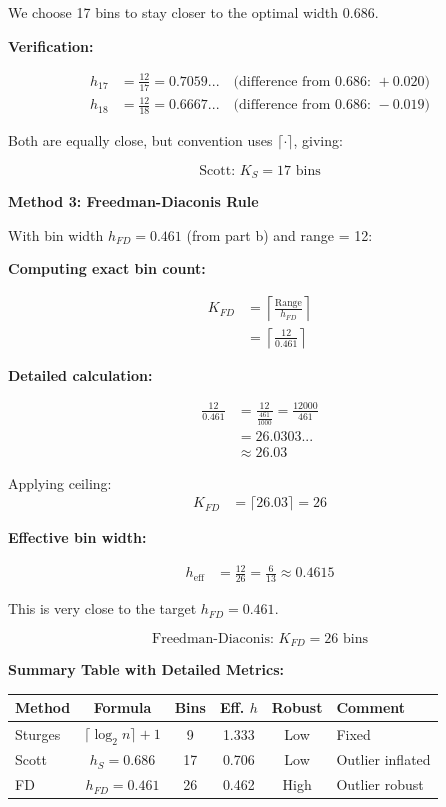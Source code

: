 \documentclass[12pt]{article}
\begin{document}
\begin{solution}
We choose 17 bins to stay closer to the optimal width 0.686.

\textbf{Verification:}

\begin{align*}
h_{17} &= \frac{12}{17} = 0.7059... \quad \text{(difference from 0.686: } +0.020\text{)} \\
h_{18} &= \frac{12}{18} = 0.6667... \quad \text{(difference from 0.686: } -0.019\text{)}
\end{align*}

Both are equally close, but convention uses \(\lceil \cdot \rceil\), giving:

\[
\boxed{\text{Scott: } K_S = 17 \text{ bins}}
\]

\textbf{Method 3: Freedman-Diaconis Rule}

With bin width \(h_{FD} = 0.461\) (from part b) and range = 12:

\textbf{Computing exact bin count:}

\begin{align*}
K_{FD} &= \left\lceil \frac{\text{Range}}{h_{FD}} \right\rceil \\
&= \left\lceil \frac{12}{0.461} \right\rceil
\end{align*}

\textbf{Detailed calculation:}

\begin{align*}
\frac{12}{0.461} &= \frac{12}{\frac{461}{1000}} = \frac{12000}{461} \\
&= 26.0303... \\
&\approx 26.03
\end{align*}

Applying ceiling:
\begin{align*}
K_{FD} &= \lceil 26.03 \rceil = 26
\end{align*}

\textbf{Effective bin width:}

\begin{align*}
h_{\text{eff}} &= \frac{12}{26} = \frac{6}{13} \approx 0.4615
\end{align*}

This is very close to the target \(h_{FD} = 0.461\).

\[
\boxed{\text{Freedman-Diaconis: } K_{FD} = 26 \text{ bins}}
\]

\textbf{Summary Table with Detailed Metrics:}

\begin{center}
\begin{tabular}{|l|c|c|c|c|p{2cm}|}
\hline
\textbf{Method} & \textbf{Formula} & \textbf{Bins} & \textbf{Eff. } $h$ & \textbf{Robust} & \textbf{Comment} \\
\hline
Sturges & \(\lceil\log_2 n\rceil + 1\) & 9 & 1.333 & Low & Fixed \\
Scott & \(h_S = 0.686\) & 17 & 0.706 & Low & Outlier inflated \\
FD & \(h_{FD} = 0.461\) & 26 & 0.462 & High & Outlier robust \\
\hline
\end{tabular}
\end{center}


\end{solution}
\end{document}
